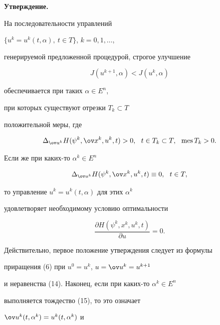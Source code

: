 {\bf Утверждение.} {\it


На последовательности управлений 


$\{u^k=u^k(t,\alpha),\ t\in T\}$, $k=0,1,\dotsc$, 


генерируемой предложенной процедурой, строгое улучшение 


$$


J(u^{k+1},\alpha)<J(u^k,\alpha)


$$


обеспечивается при таких $\alpha \in E^n$,


при которых существуют отрезки $T_k\subset T$


положительной меры, где


\begin{equation}


\Delta_{\ov u^k}H(\psi^k,\ov x^k,u^k,t)>0,


\ \ t\in T_k\subset T,\ \ \mes T_k>0.


\end{equation}


Если же при каких-то $\alpha^k\in E^n$


\begin{equation}


\Delta_{\ov u^k}H(\psi^k,\ov x^k,u^k,t)\equiv 0,\ \ t\in T,


\end{equation}


то управление $u^k=u^k(t,\alpha)$ для этих $\alpha^k$


удовлетворяет необходимому условию оптимальности 


\begin{equation}


\frac{\partial H(\psi^k,x^k,u^k,t)}{\partial u}=0.


\end{equation}


\medskip


}





Действительно, первое положение утверждения следует из формулы 


приращения (6) при $u^0=u^k$, $u=\ov u^k=u^{k+1}$


и неравенства (14). Наконец, если при каких-то $\alpha^k\in E^n$


выполняется тождество (15), то это означает


$\ov u^k(t,\alpha^k)=u^k(t,\alpha^k)$ и


